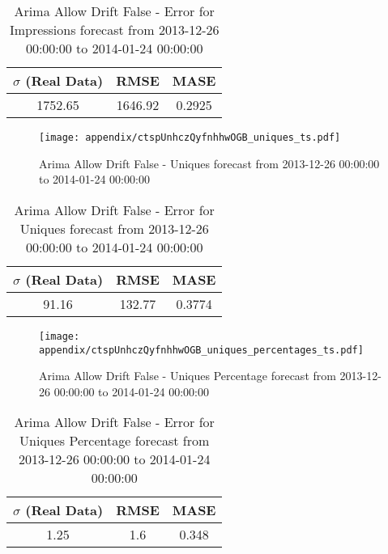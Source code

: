 \begin{table}[H]
\centering
\footnotesize
\begin{tabular}{ccc}
$\sigma$ (Real Data) & RMSE & MASE   \\ \hline
1752.65 & 1646.92 & 0.2925 \\
\end{tabular}

\vspace{0.5cm}

\caption[]{
Arima Allow Drift False - Error for Impressions forecast from 2013-12-26 00:00:00 to 2014-01-24 00:00:00}
\end{table}

\begin{figure}[H] \begin{center} \leavevmode
\texttt{[image: appendix/ctspUnhczQyfnhhwOGB\_uniques\_ts.pdf]} \caption[]{
Arima Allow Drift False - Uniques forecast from 2013-12-26 00:00:00 to 2014-01-24 00:00:00} \label{fig:appendix/ctspUnhczQyfnhhwOGB_uniques_ts.pdf} \end{center}
\end{figure}

\begin{table}[H]
\centering
\footnotesize
\begin{tabular}{ccc}
$\sigma$ (Real Data) & RMSE & MASE   \\ \hline
91.16 & 132.77 & 0.3774 \\
\end{tabular}

\vspace{0.5cm}

\caption[]{
Arima Allow Drift False - Error for Uniques forecast from 2013-12-26 00:00:00 to 2014-01-24 00:00:00}
\end{table}

\begin{figure}[H] \begin{center} \leavevmode
\texttt{[image: appendix/ctspUnhczQyfnhhwOGB\_uniques\_percentages\_ts.pdf]} \caption[]{
Arima Allow Drift False - Uniques Percentage forecast from 2013-12-26 00:00:00 to 2014-01-24 00:00:00} \label{fig:appendix/ctspUnhczQyfnhhwOGB_uniques_percentages_ts.pdf} \end{center}
\end{figure}

\begin{table}[H]
\centering
\footnotesize
\begin{tabular}{ccc}
$\sigma$ (Real Data) & RMSE & MASE   \\ \hline
1.25 & 1.6 & 0.348 \\
\end{tabular}

\vspace{0.5cm}

\caption[]{
Arima Allow Drift False - Error for Uniques Percentage forecast from 2013-12-26 00:00:00 to 2014-01-24 00:00:00}
\end{table}

